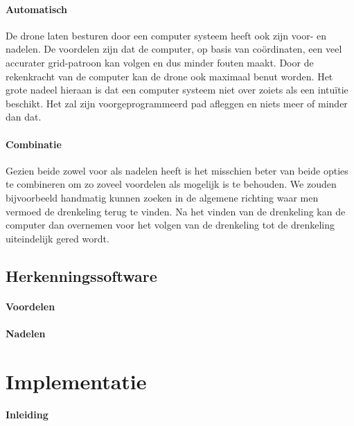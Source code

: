 \paragraph{Automatisch}

\subitem
De drone laten besturen door een computer systeem heeft ook zijn voor- en nadelen. De voordelen zijn dat de computer, op basis van coördinaten, een veel accurater grid-patroon kan volgen en dus minder fouten maakt. Door de rekenkracht van de computer kan de drone ook maximaal benut worden. Het grote nadeel hieraan is dat een computer systeem niet over zoiets als een intuïtie beschikt. Het zal zijn voorgeprogrammeerd pad afleggen en niets meer of minder dan dat.  

\paragraph{Combinatie}

\subitem
Gezien beide zowel voor als nadelen heeft is het misschien beter van beide opties te combineren om zo zoveel voordelen als mogelijk is te behouden. We zouden bijvoorbeeld handmatig kunnen zoeken in de algemene richting waar men vermoed de drenkeling terug te vinden. Na het vinden van de drenkeling kan de computer dan overnemen voor het volgen van de drenkeling tot de drenkeling uiteindelijk gered wordt. 

\subsection{Herkenningssoftware}

\paragraph{Voordelen}

\lipsum[1-2]

\paragraph{Nadelen}

\lipsum[1-2]

\section{Implementatie}

\paragraph{Inleiding}

